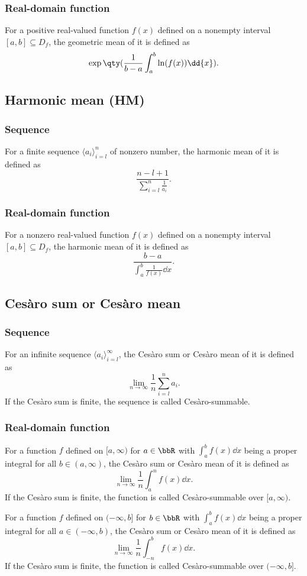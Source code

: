 \subsubsection{Real-domain function}
For a positive real-valued function $f(x)$ defined on a nonempty interval $[a,b]\subseteq D_f$, the geometric mean of it is defined as
\[\exp\qty(\frac{1}{b-a}\int_a^b\ln(f(x))\dd{x}).\]
\subsection{Harmonic mean (HM)}
\subsubsection{Sequence}
For a finite sequence $\langle a_i\rangle_{i=l}^n$ of nonzero number, the harmonic mean of it is defined as
\[\frac{n-l+1}{\sum_{i=l}^n\frac{1}{a_i}}.\]
\subsubsection{Real-domain function}
For a nonzero real-valued function $f(x)$ defined on a nonempty interval $[a,b]\subseteq D_f$, the harmonic mean of it is defined as
\[\frac{b-a}{\int_a^b\frac{1}{f(x)}\dd{x}}.\]
\subsection{Cesàro sum or Cesàro mean}
\subsubsection{Sequence}
For an infinite sequence $\langle a_i\rangle_{i=l}^{\infty}$, the Cesàro sum or Cesàro mean of it is defined as
\[\lim_{n\to\infty}\frac{1}{n}\sum_{i=l}^na_i.\]
If the Cesàro sum is finite, the sequence is called Cesàro-summable.
\subsubsection{Real-domain function}
For a function $f$ defined on $[a,\infty)$ for $a\in\bbR$ with $\int_a^bf(x)\dd{x}$ being a proper integral for all $b\in(a,\infty)$, the Cesàro sum or Cesàro mean of it is defined as
\[\lim_{n\to\infty}\frac{1}{n}\int_a^nf(x)\dd{x}.\]
If the Cesàro sum is finite, the function is called Cesàro-summable over $[a,\infty)$.

For a function $f$ defined on $(-\infty,b]$ for $b\in\bbR$ with $\int_a^bf(x)\dd{x}$ being a proper integral for all $a\in(-\infty,b)$, the Cesàro sum or Cesàro mean of it is defined as
\[\lim_{n\to\infty}\frac{1}{n}\int_{-n}^bf(x)\dd{x}.\]
If the Cesàro sum is finite, the function is called Cesàro-summable over $(-\infty,b]$.

